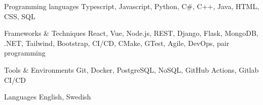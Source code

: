 
\begin{cvskills}

  \cvskill
    {Programming languages} %
    {Typescript, Javascript, Python, C\#, C++, Java, HTML, CSS, SQL} %

  \cvskill
    {Frameworks \& Techniques} %
    {React, Vue, Node.js, REST, Django, Flask, MongoDB, .NET, Tailwind, Bootstrap, CI/CD, CMake, GTest, Agile, DevOps, pair programming } %

  \cvskill
    {Tools \& Environments} %
    {Git, Docker, PostgreSQL, NoSQL, GitHub Actions, Gitlab CI/CD} %

  \cvskill
    {Languages} %
    {English, Swedish} %

\end{cvskills}
